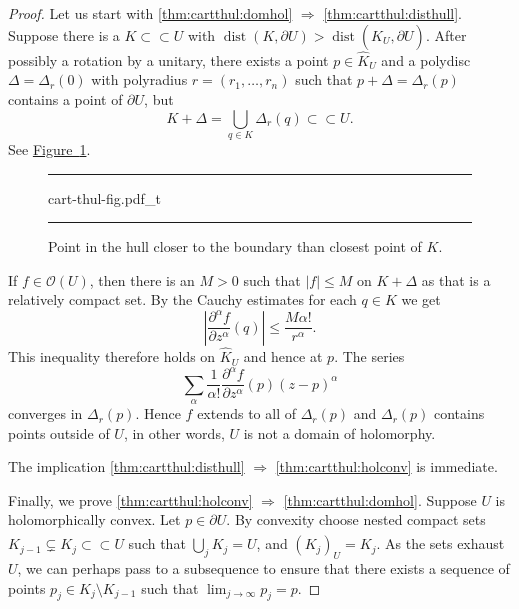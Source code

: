 \documentclass[12pt,openany]{book}
\newcommand{\sabs}[1]{\lvert {#1} \rvert}
\newcommand{\abs}[1]{\left\lvert {#1} \right\rvert}
\newcommand{\sO}{{\mathscr{O}}}
\theoremstyle{plain}
\theoremstyle{remark}
\theoremstyle{definition}
\newenvironment{myfig}{%
\begin{figure}[h!t]
\noindent\rule{\textwidth}{0.5pt}\vspace{12pt}\par\centering}%
{\par\noindent\rule{\textwidth}{0.5pt}
\end{figure}}
\theoremstyle{exercise}
\theoremstyle{example}
\newcommand{\figureref}[1]{\hyperref[#1]{Figure~\ref*{#1}}}
\begin{document}
\begin{proof}
Let us start with \ref{thm:cartthul:domhol} $\Rightarrow$
\ref{thm:cartthul:disthull}.
Suppose there is a $K \subset
\subset U$ with $\operatorname{dist}(K,\partial U) > \operatorname{dist}(\widehat{K}_U,\partial U)$.
After possibly a rotation by a unitary,
there exists a point $p \in \widehat{K}_U$ and a polydisc
$\Delta = \Delta_r(0)$ with polyradius $r = (r_1,\ldots,r_n)$ such that
$p + \Delta = \Delta_r(p)$ contains a point of $\partial U$, but
\begin{equation*}
K + \Delta = \bigcup_{q \in K} \Delta_r(q) \subset \subset U.
\end{equation*}
See \figureref{fig:cart-thul-fig}.

\begin{myfig}
{cart-thul-fig.pdf_t}
\caption{Point in the hull closer to the boundary than closest
point of $K$.\label{fig:cart-thul-fig}}
\end{myfig}

If $f \in \sO(U)$, then there is an $M > 0$ such that $\sabs{f} \leq M$ on
$K + \Delta$ as that is a relatively compact set.  By the Cauchy estimates
for each $q \in K$ we get
\begin{equation*}
\abs{\frac{\partial^\alpha f}{\partial z^\alpha}(q)} \leq \frac{M
\alpha!}{r^\alpha} .
\end{equation*}
This inequality therefore holds on $\widehat{K}_U$ and hence at $p$.
The series
\begin{equation*}
\sum_{\alpha}
\frac{1}{\alpha !}\frac{\partial^\alpha f}{\partial z^\alpha}(p) {(z-p)}^\alpha 
\end{equation*}
converges in $\Delta_r(p)$.  Hence $f$ extends to all of $\Delta_r(p)$ and
$\Delta_r(p)$ contains points outside of $U$, in other words,
$U$ is not a domain of holomorphy.

The implication \ref{thm:cartthul:disthull} $\Rightarrow$
\ref{thm:cartthul:holconv} is immediate.

Finally, we prove
\ref{thm:cartthul:holconv} $\Rightarrow$
\ref{thm:cartthul:domhol}.
Suppose $U$ is holomorphically convex.  Let $p \in \partial U$.
By convexity choose nested compact sets $K_{j-1} \subsetneq K_j \subset
\subset U$ such that $\bigcup_j K_j = U$, and $\widehat{(K_j)}_U = K_j$.
As the sets exhaust $U$, we can perhaps pass to a subsequence
to ensure that
there exists a 
sequence of points $p_j \in K_j \setminus K_{j-1}$ such that
$\lim_{j\to\infty} p_j = p$.


\end{proof}
\end{document}
